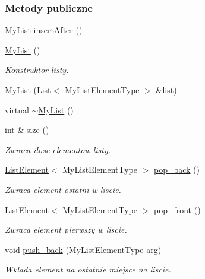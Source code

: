 \subsubsection*{Metody publiczne}
\begin{DoxyCompactItemize}
\item 
\hyperlink{class_my_list}{My\-List} \hyperlink{class_my_list_ad165e9b3e51091a88a8e6d07f8f2139a}{insert\-After} ()
\item 
\hyperlink{class_my_list_acda6bd1dd01b31aa3947e3e26695d219}{My\-List} ()
\begin{DoxyCompactList}\small\item\em Konstruktor listy. \end{DoxyCompactList}\item 
\hyperlink{class_my_list_aec4c7d8da8bffbe1e6bfd68765fa4981}{My\-List} (\hyperlink{class_list}{List}$<$ My\-List\-Element\-Type $>$ \&list)
\item 
virtual \hyperlink{class_my_list_ae2bed585526d0215f0afd6fd82a03cc9}{$\sim$\-My\-List} ()
\item 
int \& \hyperlink{class_my_list_a267f669859ef3541333082cad6b28ab7}{size} ()
\begin{DoxyCompactList}\small\item\em Zwraca ilosc elementow listy. \end{DoxyCompactList}\item 
\hyperlink{class_list_element}{List\-Element}$<$ My\-List\-Element\-Type $>$ \hyperlink{class_my_list_a8ebb806121d42e08834c7d244521c008}{pop\-\_\-back} ()
\begin{DoxyCompactList}\small\item\em Zwraca element ostatni w liscie. \end{DoxyCompactList}\item 
\hyperlink{class_list_element}{List\-Element}$<$ My\-List\-Element\-Type $>$ \hyperlink{class_my_list_a675af07472a5b7dde7ca602abb420efa}{pop\-\_\-front} ()
\begin{DoxyCompactList}\small\item\em Zwraca element pierwszy w liscie. \end{DoxyCompactList}\item 
void \hyperlink{class_my_list_a52dad29ecf7522b86df8daa3aa74702d}{push\-\_\-back} (My\-List\-Element\-Type arg)
\begin{DoxyCompactList}\small\item\em Wklada element na ostatnie miejsce na liscie. \end{DoxyCompactList}\item 

\end{DoxyCompactItemize}
